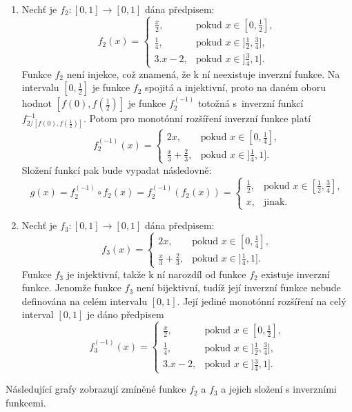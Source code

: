 \begin{example}
\label{sec: funkce}
\cite{hlinena}
\begin{enumerate}
    \item Nech\v t je $f_2:[0,1] \rightarrow [0,1]$ dána předpisem:
    $$f_2(x)= \begin{cases} \frac x2, & \mbox{pokud~} x \in [0,\frac 12],
    \\ \frac 14, & \mbox{pokud~} x \in ]\frac 12,\frac 34],
    \\ 3.x-2, & \mbox{pokud~} x \in ]\frac 34,1].
    \end{cases}$$
    Funkce $f_2$ není injekce, což znamená, že k ní neexistuje inverzní funkce. Na intervalu $[0,\frac 12]$ je funkce $f_2$ spojitá a injektivní, proto na daném oboru hodnot $[f(0),f(\frac 12)]$ je
    funkce $f_2^{(-1)}$ totožná s~inverzní funkcí
    $f_{2/[f(0),f(\frac 12)]}^{-1}.$
    Potom pro monot\'onní rozšíření inverzní funkce plat\'i
    $$f_2^{(-1)}(x)= \begin{cases} 2x, & \mbox {pokud $x \in [0,\frac 14],$}
    \\ \frac x3 + \frac 23, & \mbox {pokud $x \in ]\frac 14,1].$}
    \end{cases}$$
    Složení funkcí pak bude vypadat následovně:
    $$g(x)=f_2^{(-1)} \circ f_2(x)=f_2^{(-1)} \left(f_2(x)\right)= \begin{cases} \frac 12,
    & \mbox{pokud $x \in [\frac 12,\frac 34],$}
    \\x, & \mbox {jinak.} \end{cases}$$
    
    \item Nech\v t je $f_3:[0,1] \rightarrow [0,1]$ dána předpisem:
    $$f_3(x)= \begin{cases} 2x, & \mbox {pokud $x \in [0,\frac 14],$}
    \\ \frac x3 + \frac 23, & \mbox {pokud $x \in ]\frac 14,1].$}
    \end{cases}$$
    Funkce $f_3$ je injektivní, takže k ní narozdíl od funkce $f_2$ existuje inverzní funkce. Jenomže funkce $f_3$ není bijektivní, tudíž její inverzní funkce nebude definována na celém intervalu $[0,1]$. 
    Její jediné monot\' onní rozšíření na celý interval $[0,1]$ je dáno předpisem
    $$f_3^{(-1)}(x)= \begin{cases} \frac x2, & \mbox {pokud $x \in [0,\frac 12],$}
    \\ \frac 14, & \mbox {pokud $x \in ]\frac 12,\frac 34],$}
    \\ 3.x-2, & \mbox {pokud $x \in ]\frac 34,1]$.}
    \end{cases}$$
\end{enumerate}
\end{example}
Následující grafy zobrazují zmíněné funkce $f_2$ a $f_3$ a jejich složení s inverzními funkcemi.\\

